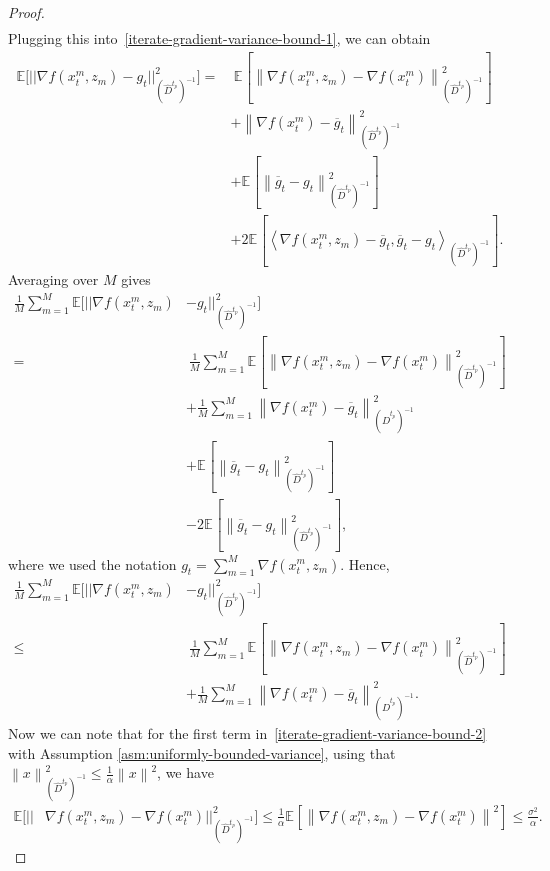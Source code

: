 \documentclass[sn-mathphys,Numbered]{sn-jnl}%
\renewcommand{\|}{\parallel}
\newcommand\ec[2][]{\ensuremath{\mathbb{E}_{#1} \left[#2\right]}}
\newcommand\ecn[3][]{\ec[#1]{\norm{#2}^2_{#3}}}
\newcommand\ev[1]{\left \langle #1 \right \rangle}
\newcommand{\norm}[1]{\left\lVert#1\right\rVert}
\newcommand{\sqn}[1]{{\left\lVert#1\right\rVert}^2}
\renewcommand {\*} {\ast}
\begin{document}
\begin{proof}
\begin{align*}
     \end{align*}
     Plugging this into~\eqref{iterate-gradient-variance-bound-1}, we can obtain
     \begin{align*}
           \mathbb{E}\Big[ ||\nabla f(x_t^m, z_m) - g_t ||^2_{(\hat{D}^{t_p})^{-1}}\Big] =&\ \ecn{\nabla f(x_t^m, z_m) - \nabla f(x_t^m)}{(\hat{D}^{t_p})^{-1}} \\ &+ \sqn{\nabla f(x_t^m) - \overline{g}_t}_{(\hat{D}^{t_p})^{-1}} \\ &+ \ecn{\overline{g}_t - g_t}{(\hat{D}^{t_p})^{-1}} \\ &+ 2 \ec{\ev{\nabla f(x_t^m, z_m) - \overline{g}_t, \overline{g}_t - g_t}_{(\hat{D}^{t_p})^{-1}}}.
     \end{align*}
     Averaging over $M$ gives
     \begin{align*}
        \frac{1}{M} \sum\limits_{m=1}^M \mathbb{E}\Big[ || \nabla f(x_t^m, z_m) &- g_t ||^2_{(\hat{D}^{t_p})^{-1}}\Big] \\=&\ \frac{1}{M} \sum\limits_{m=1}^M \ecn{\nabla f(x_t^m, z_m) - \nabla f(x_t^m)}{(\hat{D}^{t_p})^{-1}} \\ &+ \frac{1}{M} \sum\limits_{m=1}^M \sqn{\nabla f(x_t^m) - \overline{g}_t}_{(\hat{D}^{t_p})^{-1}} \\ &+ \ecn{\overline{g}_t - g_t}{(\hat{D}^{t_p})^{-1}} \\
         &- 2 \ecn{\overline{g}_t - g_t}{(\hat{D}^{t_p})^{-1}},
     \end{align*}
     where we used the notation $g_t = \sum\limits_{m=1}^M \nabla f(x_t^m, z_m)$. Hence,
     \begin{align}
         \label{iterate-gradient-variance-bound-2}
         \frac{1}{M} \sum\limits_{m=1}^M \mathbb{E}\Big[ ||\nabla f(x_t^m, z_m) &-g_t||^2_{(\hat{D}^{t_p})^{-1}}\Big] \nonumber \\ \leq&\ \frac{1}{M} \sum\limits_{m=1}^M \ecn{\nabla f(x_t^m, z_m) - \nabla f(x_t^m)}{(\hat{D}^{t_p})^{-1}}  \nonumber \\ &+ \frac{1}{M} \sum\limits_{m=1}^M \sqn{\nabla f(x_t^m) - \overline{g}_t}_{(\hat{D}^{t_p})^{-1}}.
     \end{align}   
     Now we can note that for the first term in~\eqref{iterate-gradient-variance-bound-2} with Assumption \ref{asm:uniformly-bounded-variance}, using that $\sqn{x}_{(\hat{D}^{t_p})^{-1}} \leq \frac{1}{\alpha}\sqn{x}$, we have
     \begin{align}
     \label{iterate-gradient-variance-bound-3}
         \mathbb{E}\Big[ ||&\nabla f(x_t^m, z_m) - \nabla f(x_t^m)||^2_{(\hat{D}^{t_p})^{-1}}\Big] \leq \frac{1}{\alpha} \ecn{\nabla f(x_t^m, z_m) - \nabla f(x_t^m)}{}\leq \frac{\sigma^2}{\alpha}.

\end{align}
\end{proof}
\end{document}
